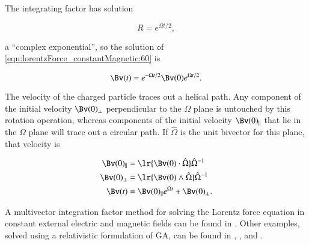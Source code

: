 The integrating factor has solution

\begin{dmath}\label{eqn:lorentzForce_constantMagnetic:180}
R = e^{\Omega t/2},
\end{dmath}

a ``complex exponential'', so the solution of \cref{eqn:lorentzForce_constantMagnetic:60} is

\begin{dmath}\label{eqn:lorentzForce_constantMagnetic:200}
\Bv(t) = e^{-\Omega t/2} \Bv(0) e^{\Omega t/2}.
\end{dmath}

The velocity of the charged particle traces out a helical path.
Any component of the initial velocity \( \Bv(0)_\perp \) perpendicular to the \( \Omega \) plane is untouched by this rotation operation, whereas components of the initial velocity \( \Bv(0)_\parallel \) that lie in the \( \Omega \) plane will trace out a circular path.
If \( \hat{\Omega} \) is the unit bivector for this plane, that velocity is

\begin{dmath}\label{eqn:lorentzForce_constantMagnetic:220}
\begin{aligned}
\Bv(0)_\parallel &= \lr{ \Bv(0) \cdot \hat{\Omega} } \hat{\Omega}^{-1} \\
\Bv(0)_\perp &= \lr{ \Bv(0) \wedge \hat{\Omega} } \hat{\Omega}^{-1} \\
\Bv(t) &= \Bv(0)_\parallel e^{\Omega t} + \Bv(0)_\perp.
\end{aligned}
\end{dmath}

A multivector integration factor method for solving the Lorentz force equation in constant external electric and magnetic fields can be found in \citep{hestenes1999nfc}.  Other examples, solved using a relativistic formulation of GA, can be found in \citep{doran2003gap},
\citep{hestenes1974properdynamics}, and
\citep{hestenes1974propermechanics}.
